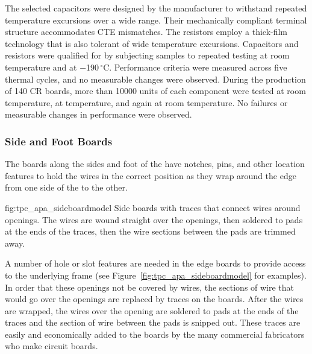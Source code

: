 The selected capacitors were designed by the manufacturer to withstand repeated temperature excursions over a wide range. Their mechanically compliant terminal structure accommodates CTE mismatches. The resistors employ a thick-film technology that is also tolerant of wide temperature excursions.  Capacitors and resistors were qualified for  by subjecting samples to repeated testing at room temperature and at \num{-190}\,$^\circ$C.  Performance criteria were measured across five thermal cycles, and no measurable changes were observed. During the production of \num{140} CR boards, more than \num{10000} units of each component were tested at room temperature, at \lar temperature, and again at room temperature. No failures or measurable changes in performance were observed.

\subsubsection{Side and Foot Boards}

The boards along the sides and foot of the  have notches, pins, and other location features to hold the wires in the correct position as they wrap around the edge from one side of the  to the other.  

\begin{dunefigure}{fig:tpc_apa_sideboardmodel}
{Side boards with traces that connect wires around openings.  The wires are wound straight over the openings, then soldered to pads at the ends of the traces, then the wire sections between the pads are trimmed away.}
\setlength{\fboxsep}{0pt}
\setlength{\fboxrule}{0.5pt}
\quad
{}
\end{dunefigure}

A number of hole or slot features are needed in the edge boards to provide access to the underlying frame (see Figure~\ref{fig:tpc_apa_sideboardmodel} for examples).  In order that these openings not be covered by wires, the sections of wire that would go over the openings are replaced by traces on the boards.  After the wires are wrapped, the wires over the opening are soldered to pads at the ends of the traces and the section of wire between the pads is snipped out.  These traces are easily and economically added to the boards by the many commercial fabricators who make circuit boards. 

